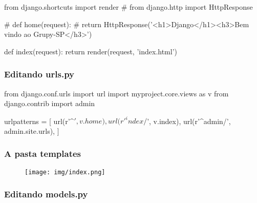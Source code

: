 \documentclass{beamer}
\begin{document}
{\begin{frame}[fragile]
\begin{pythoncode}
from django.shortcuts import render
# from django.http import HttpResponse

# def home(request):
#     return HttpResponse('<h1>Django</h1><h3>Bem vindo ao Grupy-SP</h3>')

def index(request):
    return render(request, 'index.html')
\end{pythoncode}


\end{frame}

\begin{frame}[fragile]\frametitle{Editando urls.py}

\begin{pythoncode}
from django.conf.urls import url
import myproject.core.views as v
from django.contrib import admin

urlpatterns = [
    url(r'^$', v.home),
    url(r'^index/$', v.index),
    url(r'^admin/', admin.site.urls),
]
\end{pythoncode}


\end{frame}


\begin{frame}\frametitle{A pasta templates}


\end{frame}

\begin{frame}

    \begin{figure}[h]
      \centering
        \texttt{[image: img/index.png]}
    \end{figure}

\end{frame}


\begin{frame}[fragile]\frametitle{Editando models.py}


\end{frame}}
\end{document}
